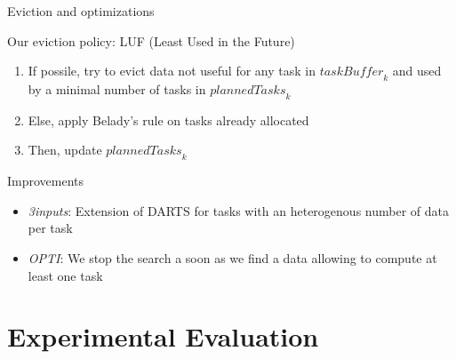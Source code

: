\documentclass{libs/ufc_format}
\newcommand{\threeinputs}{\textit{3inputs}\xspace}
\newcommand{\OPTI}{\textit{OPTI}\xspace}
\newcommand{\GPU}[1]{\ensuremath{\mathrm{GPU}_{#1}}\xspace}
\newcommand{\plannedTasks}[1]{\ensuremath{\mathit{plannedTasks}_{#1}}\xspace}
\newcommand{\pulledTasks}[1]{\ensuremath{\mathit{taskBuffer}_{#1}}\xspace}
\newcommand{\nologo}{\setbeamertemplate{logo}{}} %
\begin{document}
\begin{frame}{Eviction and optimizations}
	\begin{alertblock}{Our eviction policy: LUF (Least Used in the Future)}
		\begin{enumerate}
			\item If possile, try to evict data not useful for any task in \pulledTasks{k} and used by a minimal number of tasks in $\plannedTasks{k}$
			\item Else, apply Belady's rule on tasks already allocated
			\item Then, update $\plannedTasks{k}$
		\end{enumerate}
	\end{alertblock}
	\begin{alertblock}{Improvements}
		\begin{itemize}
			\item \threeinputs: Extension of DARTS for tasks with an heterogenous number of data per task
			\item \OPTI: We stop the search a soon as we find a data allowing to compute at least one task
		\end{itemize}
	\end{alertblock}
\end{frame}

\section{Experimental Evaluation}
\end{document}
